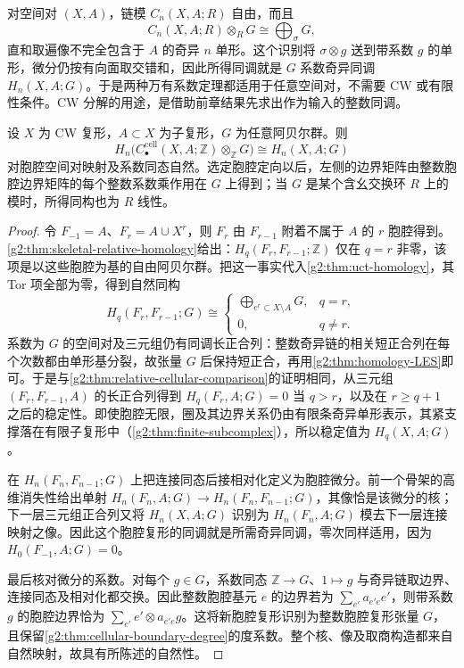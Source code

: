 对空间对 \((X,A)\)，链模 \(C_n(X,A;R)\) 自由，而且
\[
	C_n(X,A;R)\otimes_R G\cong\bigoplus_{\sigma}G,
\]
直和取遍像不完全包含于 \(A\) 的奇异 \(n\) 单形。这个识别将 \(\sigma\otimes g\) 送到带系数 \(g\) 的单形，微分仍按有向面取交错和，因此所得同调就是 \(G\) 系数奇异同调 \(H_n(X,A;G)\)。于是两种万有系数定理都适用于任意空间对，不需要 CW 或有限性条件。CW 分解的用途，是借助前章结果先求出作为输入的整数同调。

\begin{corollary}\label{g2:cor:cellular-coefficients}
	设 \(X\) 为 CW 复形，\(A\subset X\) 为子复形，\(G\) 为任意阿贝尔群。则
	\[
		H_n\bigl(C_\bullet^{\mathrm{cell}}(X,A;\mathbb Z)\otimes_{\mathbb Z}G\bigr)\cong H_n(X,A;G)
	\]
	对胞腔空间对映射及系数同态自然。选定胞腔定向以后，左侧的边界矩阵由整数胞腔边界矩阵的每个整数系数乘作用在 \(G\) 上得到；当 \(G\) 是某个含幺交换环 \(R\) 上的模时，所得同构也为 \(R\) 线性。
\end{corollary}
\begin{proof}
	令 \(F_{-1}=A\)、\(F_r=A\cup X^r\)，则 \(F_r\) 由 \(F_{r-1}\) 附着不属于 \(A\) 的 \(r\) 胞腔得到。\cref{g2:thm:skeletal-relative-homology}给出：\(H_q(F_r,F_{r-1};\mathbb Z)\) 仅在 \(q=r\) 非零，该项是以这些胞腔为基的自由阿贝尔群。把这一事实代入\cref{g2:thm:uct-homology}，其 Tor 项全部为零，得到自然同构
	\[
		H_q(F_r,F_{r-1};G)\cong
		\begin{cases}
			\displaystyle\bigoplus_{e^r\subset X\setminus A}G,&q=r,\\
			0,&q\ne r.
		\end{cases}
	\]
	系数为 \(G\) 的空间对及三元组仍有同调长正合列：整数奇异链的相关短正合列在每个次数都由单形基分裂，故张量 \(G\) 后保持短正合，再用\cref{g2:thm:homology-LES}即可。于是与\cref{g2:thm:relative-cellular-comparison}的证明相同，从三元组 \((F_r,F_{r-1},A)\) 的长正合列得到 \(H_q(F_r,A;G)=0\) 当 \(q>r\)，以及在 \(r\ge q+1\) 之后的稳定性。即使胞腔无限，圈及其边界关系仍由有限条奇异单形表示，其紧支撑落在有限子复形中（\cref{g2:thm:finite-subcomplex}），所以稳定值为 \(H_q(X,A;G)\)。

	在 \(H_n(F_n,F_{n-1};G)\) 上把连接同态后接相对化定义为胞腔微分。前一个骨架的高维消失性给出单射 \(H_n(F_n,A;G)\to H_n(F_n,F_{n-1};G)\)，其像恰是该微分的核；下一层三元组正合列又将 \(H_n(X,A;G)\) 识别为 \(H_n(F_n,A;G)\) 模去下一层连接映射之像。因此这个胞腔复形的同调就是所需奇异同调，零次同样适用，因为 \(H_0(F_{-1},A;G)=0\)。

	最后核对微分的系数。对每个 \(g\in G\)，系数同态 \(\mathbb Z\to G\)、\(1\mapsto g\) 与奇异链取边界、连接同态及相对化都交换。因此整数胞腔基元 \(e\) 的边界若为 \(\sum_{e'} a_{e'e}e'\)，则带系数 \(g\) 的胞腔边界恰为 \(\sum_{e'} e'\otimes a_{e'e}g\)。这将新胞腔复形识别为整数胞腔复形张量 \(G\)，且保留\cref{g2:thm:cellular-boundary-degree}的度系数。整个核、像及取商构造都来自自然映射，故具有所陈述的自然性。
\end{proof}

